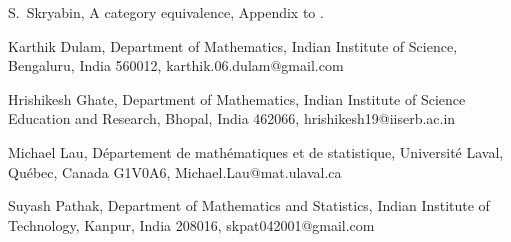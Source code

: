 \documentclass[11pt]{article}
\numberwithin{equation}{section}
\begin{document}
\begin{thebibliography}{}




 S.~Skryabin, A category equivalence, Appendix to \cite{premet02}.
  
  



  
\end{thebibliography}


\bigskip

\noindent
Karthik Dulam, Department of Mathematics, Indian Institute of Science, Bengaluru, India 560012, karthik.06.dulam@gmail.com

\medskip

\noindent
Hrishikesh Ghate, Department of Mathematics, Indian Institute of Science Education and Research, Bhopal, India 462066, hrishikesh19@iiserb.ac.in

\medskip

\noindent
Michael Lau, D\'epartement de math\'ematiques et de statistique, Universit\'e Laval, Qu\'ebec, Canada G1V0A6, Michael.Lau@mat.ulaval.ca

\medskip

\noindent
Suyash Pathak, Department of Mathematics and Statistics, Indian Institute of Technology, Kanpur, India 208016, skpat042001@gmail.com
\end{document}

